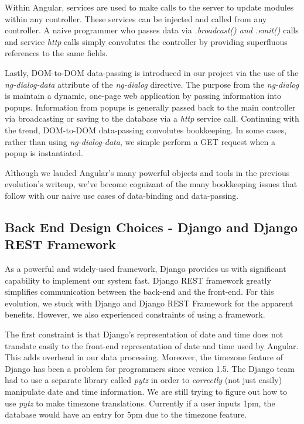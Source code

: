 \documentclass[a4paper]{article}
\begin{document}
Within Angular, services are used to make calls to the server to update modules within any controller. These services can be injected and called from any controller. A naive programmer who passes data via \textit{.broadcast() and .emit()} calls and service \textit{http} calls simply convolutes the controller by providing superfluous references to the same fields.

Lastly, DOM-to-DOM data-passing is introduced in our project via the use of the \textit{ng-dialog-data} attribute of the \textit{ng-dialog} directive. The purpose from the \textit{ng-dialog} is maintain a dynamic, one-page web application by passing information into popups. Information from popups is generally passed back to the main controller via broadcasting or saving to the database via a \textit{http} service call. Continuing with the trend, DOM-to-DOM data-passing convolutes bookkeeping. In some cases, rather than using \textit{ng-dialog-data}, we simple perform a GET request when a popup is instantiated.

Although we lauded Angular's many powerful objects and tools in the previous evolution's writeup, we've become cognizant of the many bookkeeping issues that follow with our naive use cases of data-binding and data-passing. 


\subsection{Back End Design Choices - Django and Django REST Framework}
As a powerful and widely-used framework, Django provides us with significant capability to implement our system fast. Django REST framework greatly simplifies communication between the back-end and the front-end. For this evolution, we stuck with Django and Django REST Framework for the apparent benefits. However, we also experienced constraints of using a framework.

The first constraint is that Django's representation of date and time does not translate easily to the front-end representation of date and time used by Angular. This adds overhead in our data processing. Moreover, the timezone feature of Django has been a problem for programmers since version 1.5. The Django team had to use a separate library called \emph{pytz} in order to \emph{correctly} (not just easily) manipulate date and time information. We are still trying to figure out how to use \emph{pytz} to make timezone translations. Currently if a user inputs 1pm, the database would have an entry for 5pm due to the timezone feature.
\end{document}
